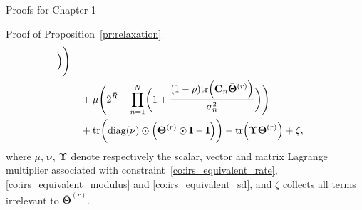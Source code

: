 \begin{section}{Proofs for Chapter 1}
\begin{subsection}{Proof of Proposition~\ref{pr:relaxation}}
\begin{equation}
\begin{split}
					\Bigr)
					\Biggr)\\
				& \quad + \mu \Biggl(
					2^{\bar{R}} - \prod_{n=1}^N \biggl(
						1 + \frac{(1-\rho) \mathrm{tr}\Bigl(
							\mathbf{C}_n \bar{\mathbf{\Theta}}^{(r)}
						\Bigr)}{\sigma_n^2}
					\biggr)
				\Biggr)\\
				& \quad + \mathrm{tr}\biggl(
					\mathrm{diag}(\mathbf{\nu}) \odot \Bigl(
						\bar{\mathbf{\Theta}}^{(r)} \odot \mathbf{I} - \mathbf{I}
					\Bigr)
				\biggr) - \mathrm{tr} \Bigl(
					\mathbf{\Upsilon} \bar{\mathbf{\Theta}}^{(r)}
				\Bigr) + \zeta,
			\end{split}
		\end{equation}
		where $\mu$, $\mathbf{\nu}$, $\mathbf{\Upsilon}$ denote respectively the scalar, vector and matrix Lagrange multiplier associated with constraint~\eqref{co:irs_equivalent_rate}, \eqref{co:irs_equivalent_modulus} and \eqref{co:irs_equivalent_sd}, and $\zeta$ collects all terms irrelevant to $\bar{\mathbf{\Theta}}^{(r)}$.

\end{subsection}
\end{section}
